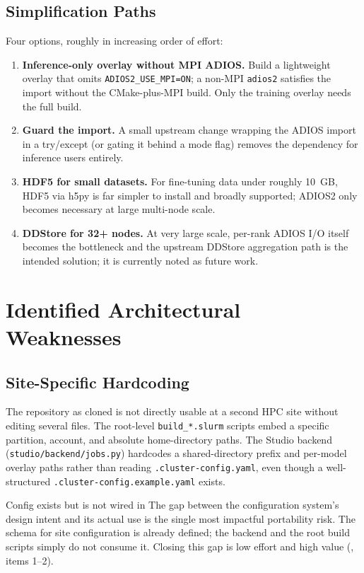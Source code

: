 \documentclass[11pt]{article}
\newcommand{\code}[1]{\texttt{#1}}
\newcommand{\file}[1]{\texttt{\small #1}}
\begin{document}
\subsection{Simplification Paths}
Four options, roughly in increasing order of effort:
\begin{enumerate}
  \item \textbf{Inference-only overlay without MPI ADIOS.} Build a lightweight overlay
    that omits \code{ADIOS2\_USE\_MPI=ON}; a non-MPI \code{adios2} satisfies the import
    without the CMake-plus-MPI build. Only the training overlay needs the full build.
  \item \textbf{Guard the import.} A small upstream change wrapping the ADIOS import in
    a try/except (or gating it behind a mode flag) removes the dependency for inference
    users entirely.
  \item \textbf{HDF5 for small datasets.} For fine-tuning data under roughly 10~GB,
    HDF5 via h5py is far simpler to install and broadly supported; ADIOS2 only becomes
    necessary at large multi-node scale.
  \item \textbf{DDStore for 32+ nodes.} At very large scale, per-rank ADIOS I/O itself
    becomes the bottleneck and the upstream DDStore aggregation path is the intended
    solution; it is currently noted as future work.
\end{enumerate}

\section{Identified Architectural Weaknesses}
\label{sec:weaknesses}

\subsection{Site-Specific Hardcoding}
The repository as cloned is not directly usable at a second HPC site without editing
several files. The root-level \file{build\_*.slurm} scripts embed a specific
partition, account, and absolute home-directory paths. The Studio backend
(\file{studio/backend/jobs.py}) hardcodes a shared-directory prefix and per-model
overlay paths rather than reading \file{.cluster-config.yaml}, even though a
well-structured \file{.cluster-config.example.yaml} exists.

\begin{weakness}{Config exists but is not wired in}
The gap between the configuration system's design intent and its actual use is the
single most impactful portability risk. The schema for site configuration is already
defined; the backend and the root build scripts simply do not consume it. Closing this
gap is low effort and high value (, items 1--2).
\end{weakness}
\end{document}
